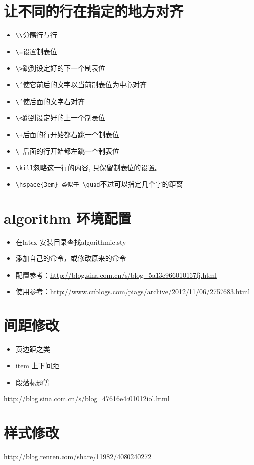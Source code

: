 \documentclass[UTF8,a4paper,8pt]{ctexart}
\begin{document}
\section{让不同的行在指定的地方对齐}
	   \begin{itemize}
		   	\item \verb|\\|分隔行与行
		   	\item  \verb|\=|设置制表位
		   	\item  \verb|\>|跳到设定好的下一个制表位
		   	\item  \verb|\‘|使它前后的文字以当前制表位为中心对齐
		   	\item  \verb|\’|使后面的文字右对齐
		   	\item  \verb|\<|跳到设定好的上一个制表位
		   	\item  \verb|\+|后面的行开始都右跳一个制表位
		   	\item  \verb|\-|后面的行开始都左跳一个制表位
		   	\item  \verb|\kill|忽略这一行的内容, 只保留制表位的设置。		   			   	
		   	\item  \verb|\hspace{3em} 类似于 \quad|不过可以指定几个字的距离
	   \end{itemize}
 	
	 	
\section{algorithm 环境配置}
		\begin{itemize}
			\item  在latex 安装目录查找algorithmic.sty
			\item  添加自己的命令，或修改原来的命令
			
			\item  配置参考：\url{http://blog.sina.com.cn/s/blog\_5a13c966010167fj.html}
			\item  使用参考：\url{http://www.cnblogs.com/piags/archive/2012/11/06/2757683.html}
		\end{itemize}	

\section{间距修改}
		\begin{itemize}
			\item 页边距之类
			\item item 上下间距
			\item 段落标题等
		\end{itemize}
		
		\url{http://blog.sina.com.cn/s/blog_47616e4c01012iol.html}
		
	
\section{样式修改}
		\url{http://blog.renren.com/share/11982/4080240272}     
\end{document}
